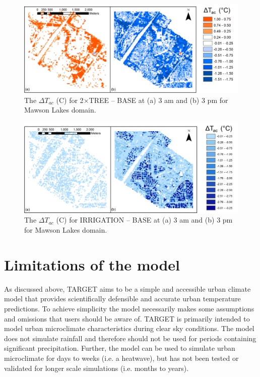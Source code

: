 \documentclass[gmd, manuscript]{copernicus}
\begin{document}
\begin{figure}[!htbp]
\includegraphics[width=1.0\textwidth,keepaspectratio]{fig09.png}
 \caption{The $\Delta T_{ac}$ (\degree C) for 2$\times$TREE -- BASE at (a) 3 am and (b) 3 pm for Mawson Lakes domain.} \label{fig:tree_scen}


\end{figure}

\begin{figure}[!htbp]

\includegraphics[width=1.0\textwidth,keepaspectratio]{fig10.png}

 \caption{The $\Delta T_{ac}$ (\degree C) for IRRIGATION -- BASE  at (a) 3 am and (b) 3 pm for Mawson Lakes domain.} \label{fig:irr_scen}


\end{figure}



\section{Limitations of the model}



As discussed above, TARGET aims to be a simple and accessible urban climate model that provides scientifically defensible and accurate urban temperature predictions. To achieve simplicity the model necessarily makes some  assumptions and omissions that users should be aware of.   TARGET is primarily intended to model urban microclimate characteristics during clear sky conditions. The model does not simulate rainfall and therefore should not be used for periods containing significant precipitation. Further, the model can be used to simulate urban microclimate for days to weeks (i.e. a heatwave), but has not been tested or validated for longer scale simulations (i.e. months to years). 
\end{document}
